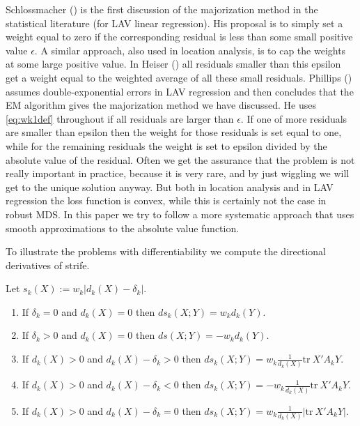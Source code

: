 \documentclass[
  12pt,
  letterpaper,
  DIV=11,
  numbers=noendperiod]{scrartcl}
\providecommand{\tightlist}{%
  \setlength{\itemsep}{0pt}\setlength{\parskip}{0pt}}\usepackage{longtable,booktabs,array}
\theoremstyle{plain}
\theoremstyle{remark}
\begin{document}
Schlossmacher () is the first
discussion of the majorization method in the statistical literature (for
LAV linear regression). His proposal is to simply set a weight equal to
zero if the corresponding residual is less than some small positive
value \(\epsilon\). A similar approach, also used in location analysis,
is to cap the weights at some large positive value. In Heiser
() all residuals smaller than this epsilon
get a weight equal to the weighted average of all these small residuals.
Phillips () assumes double-exponential
errors in LAV regression and then concludes that the EM algorithm gives
the majorization method we have discussed. He uses \eqref{eq:wk1def}
throughout if all residuals are larger than \(\epsilon\). If one of more
residuals are smaller than epsilon then the weight for those residuals
is set equal to one, while for the remaining residuals the weight is set
to epsilon divided by the absolute value of the residual. Often we get
the assurance that the problem is not really important in practice,
because it is very rare, and by just wiggling we will get to the unique
solution anyway. But both in location analysis and in LAV regression the
loss function is convex, while this is certainly not the case in robust
MDS. In this paper we try to follow a more systematic approach that uses
smooth approximations to the absolute value function.

To illustrate the problems with differentiability we compute the
directional derivatives of strife.

Let \(s_k(X):=w_k|d_k(X)-\delta_k|\).

\begin{enumerate}
\def\labelenumi{\arabic{enumi}.}
\tightlist
\item
  If \(\delta_k=0\) and \(d_k(X)=0\) then \(ds_k(X;Y)=w_kd_k(Y)\).
\item
  If \(\delta_k>0\) and \(d_k(X)=0\) then \(ds(X;Y)=-w_kd_k(Y)\).
\item
  If \(d_k(X)>0\) and \(d_k(X)-\delta_k>0\) then
  \(ds_k(X;Y)=w_k\frac{1}{d_k(X)}\text{tr}\ X'A_kY\).
\item
  If \(d_k(X)>0\) and \(d_k(X)-\delta_k<0\) then
  \(ds_k(X;Y)=-w_k\frac{1}{d_k(X)}\text{tr}\ X'A_kY\).
\item
  If \(d_k(X)>0\) and \(d_k(X)-\delta_k=0\) then
  \(ds_k(X;Y)=w_k\frac{1}{d_k(X)}|\text{tr}\ X'A_kY|\).
\end{enumerate}
\end{document}

